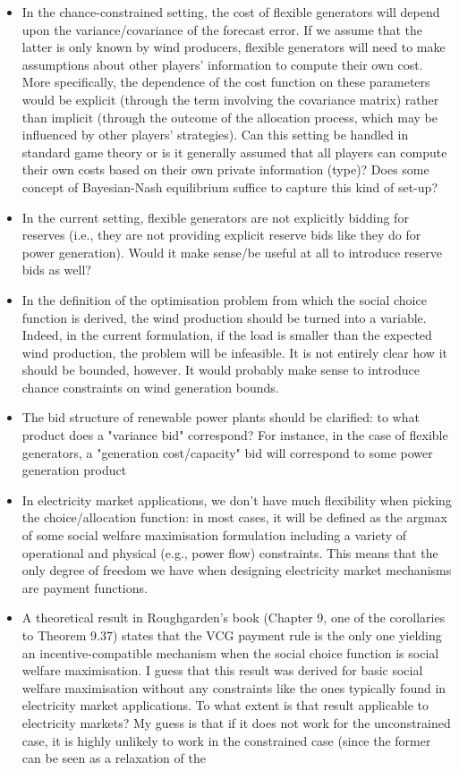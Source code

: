 \documentclass{article}
\begin{document}
\begin{itemize}
\item In the chance-constrained setting, the cost of flexible generators will depend upon the variance/covariance of the forecast error. If we assume that the latter is only known by wind producers, flexible generators will need to make assumptions about other players' information to compute their own cost. More specifically, the dependence of the cost function on these parameters would be explicit (through the term involving the covariance matrix) rather than implicit (through the outcome of the allocation process, which may be influenced by other players' strategies). Can this setting be handled in standard game theory or is it generally assumed that all players can compute their own costs based on their own private information (type)? Does some concept of Bayesian-Nash equilibrium suffice to capture this kind of set-up?
\item In the current setting, flexible generators are not explicitly bidding for reserves (i.e., they are not providing explicit reserve bids like they do for power generation). Would it make sense/be useful at all to introduce reserve bids as well?
\item In the definition of the optimisation problem from which the social choice function is derived, the wind production should be turned into a variable. Indeed, in the current formulation, if the load is smaller than the expected wind production, the problem will be infeasible. It is not entirely clear how it should be bounded, however. It would probably make sense to introduce chance constraints on wind generation bounds. 
\item The bid structure of renewable power plants should be clarified: to what product does a "variance bid" correspond? For instance, in the case of flexible generators, a "generation cost/capacity" bid will correspond to some power generation product 
\item In electricity market applications, we don't have much flexibility when picking the choice/allocation function: in most cases, it will be defined as the argmax of some social welfare maximisation formulation including a variety of operational and physical (e.g., power flow) constraints. This means that the only degree of freedom we have when designing electricity market mechanisms are payment functions. 
\item A theoretical result in Roughgarden's book (Chapter 9, one of the corollaries to Theorem 9.37) states that the VCG payment rule is the only one yielding an incentive-compatible mechanism when the social choice function is social welfare maximisation. I guess that this result was derived for basic social welfare maximisation without any constraints like the ones typically found in electricity market applications. To what extent is that result applicable to electricity markets? My guess is that if it does not work for the unconstrained case, it is highly unlikely to work in the constrained case (since the former can be seen as a relaxation of the 

\end{itemize}
\end{document}
